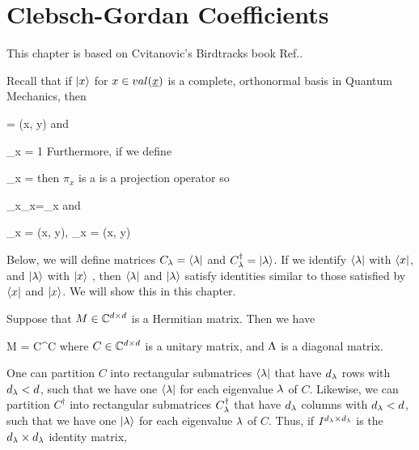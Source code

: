 \chapter{Clebsch-Gordan Coefficients}
\label{ch-clebsch-gordan}
This chapter is based on
Cvitanovic's Birdtracks book Ref.\cite{birdtracks-book}.

Recall that if $|x\rangle$ for
$x\in val(\rvx)$ is a complete, orthonormal
basis in Quantum Mechanics, then

\beq
{} =  \delta(x, y)
\quad
{}
\eeq
and

\beq
\sum_x  = 1
\quad
{}
\eeq
Furthermore, if we define

\beq
\pi_x = 
\eeq
then $\pi_x$ is a
is a projection operator so

\beq
\pi_x\pi_x=\pi_x
\eeq
and

\beq
\pi_x =  
\delta(x, y),\quad
{}\pi_x = 
\delta(x, y)
\eeq

Below, we will
define matrices $C_\lambda=\langle\lambda|$ and $C^\dagger_\lambda = |\lambda\rangle$.
If we identify $\langle\lambda|$
with $\langle x|$,
and $|\lambda\rangle$
with
$|x\rangle$
, then $\langle\lambda|$ and $|\lambda\rangle$
satisfy identities
similar to those satisfied by $\langle x|$ and $|x\rangle$. 
We will show this
in this chapter.



Suppose that  $M\in{ \mathbb{C}}^{d\times d}$ is a Hermitian matrix. Then we have

\beq
M = C^\dagger \Lam C
\eeq
where 
$C\in { \mathbb{C}}^{d\times d}$ is a unitary matrix, and $\Lambda$ is a diagonal matrix.



One can partition 
$C$ into rectangular submatrices $\langle\lambda|$ that have  $d_\lambda$ rows with $d_\lambda < d$, 
such that we have one $\langle\lambda|$
for each eigenvalue $\lambda$ of $C$.
Likewise, we can partition 
$C^\dagger$ into rectangular submatrices $C^\dagger_\lambda$ that have $d_\lambda$ columns with $d_\lambda < d$, such that we have one $|\lambda\rangle$
for each eigenvalue $\lambda$ of $C$. Thus, if $I^{d_\lambda\times d_\lambda}$
is the $d_\lambda\times d_\lambda$
identity matrix,

